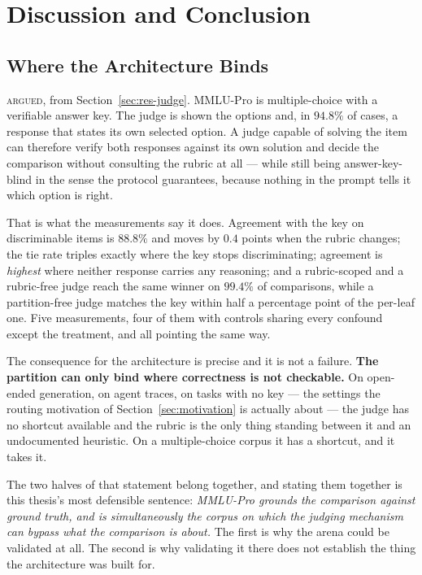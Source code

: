 \chapter{Discussion and Conclusion}\label{ch:discussion}\label{ch:conclusion}

\section{Where the Architecture Binds}\label{sec:disc-rq1}

\textsc{argued}, from Section~\ref{sec:res-judge}.
MMLU-Pro is multiple-choice with a verifiable answer key. The judge is
shown the options and, in $94.8\%$ of cases, a response that states its
own selected option. A judge capable of solving the item can therefore
verify both responses against its own solution and decide the
comparison without consulting the rubric at all --- while still being
answer-key-blind in the sense the protocol guarantees, because nothing
in the prompt tells it which option is right.

That is what the measurements say it does. Agreement with the key on
discriminable items is $88.8\%$ and moves by $0.4$ points when the
rubric changes; the tie rate triples exactly where the key stops
discriminating; agreement is \emph{highest} where neither response
carries any reasoning; and a rubric-scoped and a rubric-free judge
reach the same winner on $99.4\%$ of comparisons, while a partition-free
judge matches the key within half a percentage point of the per-leaf
one. Five measurements, four of them with controls sharing every
confound except the treatment, and all pointing the same way.

The consequence for the architecture is precise and it is not a
failure. \textbf{The partition can only bind where correctness is not
checkable.} On open-ended generation, on agent traces, on tasks with no
key --- the settings the routing motivation of
Section~\ref{sec:motivation} is actually about --- the judge has no
shortcut available and the rubric is the only thing standing between it
and an undocumented heuristic. On a multiple-choice corpus it has a
shortcut, and it takes it.

The two halves of that statement belong together, and stating them
together is this thesis's most defensible sentence: \emph{MMLU-Pro
grounds the comparison against ground truth, and is simultaneously the
corpus on which the judging mechanism can bypass what the comparison is
about.} The first is why the arena could be validated at all. The
second is why validating it there does not establish the thing the
architecture was built for.

